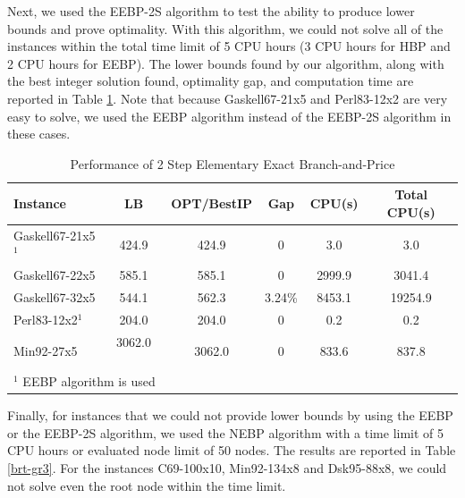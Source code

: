 Next, we used the EEBP-2S algorithm to test the ability to produce
lower bounds and prove optimality. With this algorithm, we could not
solve all of the instances within the total time limit of 5 CPU hours (3 CPU 
hours for HBP and 2 CPU hours for EEBP). The
lower bounds found by our algorithm, along with the best integer
solution found, optimality gap, and computation time are reported in
Table \ref{brt-gr2}. Note that because Gaskell67-21x5 and Perl83-12x2
are very easy to solve, we used the EEBP algorithm instead of the
EEBP-2S algorithm in these cases.
\begin{table}[ht]
\centering
\caption{Performance of 2 Step Elementary Exact Branch-and-Price}\label{brt-gr2}
\begin {tabular}[t]{|l|c|c|c|c|c|}  
\hline
Instance	        &       LB	&	OPT/BestIP &	Gap    & CPU(s)	& 	Total CPU(s)	\\\hline
Gaskell67-21x5$^1$	&	424.9	&	424.9	&	0	&	3.0	&	3.0	\\
Gaskell67-22x5   	&	585.1	&	585.1	&	0	&	2999.9	&	3041.4	\\
Gaskell67-32x5  	&	544.1	&	562.3	&	3.24\%	&	8453.1	&	19254.9	\\
Perl83-12x2$^1$ 	&	204.0	&	204.0	&	0	&	0.2	&	0.2	\\
Min92-27x5      	&	3062.0 \ \ &	3062.0	&	0	&	833.6	&	837.8	\\
\hline
\multicolumn{6}{l}{$^1$ EEBP algorithm is used}\\
\end{tabular}
\end{table}

Finally, for instances that we could not provide lower bounds by using
the EEBP or the EEBP-2S algorithm, we used the NEBP algorithm with a
time limit of 5 CPU hours or evaluated node limit of 50 nodes. The
results are reported in Table \ref{brt-gr3}. For the instances
C69-100x10, Min92-134x8 and Dsk95-88x8, we could not solve even the
root node within the time limit. 

